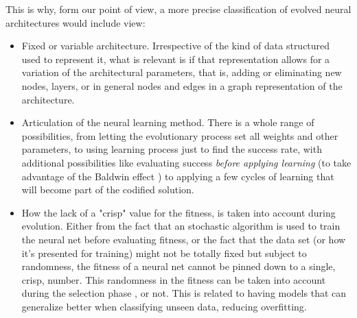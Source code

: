 \documentclass[conference]{IEEEtran}\usepackage[]{graphicx}\usepackage[]{color}
\begin{document}
This is why, form our point of view, a more precise classification of evolved neural architectures would include
view: \begin{itemize}
  \item Fixed or variable architecture. Irrespective of the kind of
    data structured used to represent it, what is relevant is if that
    representation allows for a variation of the architectural
    parameters, that is, adding or eliminating new nodes, layers, or
    in general nodes and edges in a graph representation of the
    architecture.
  \item Articulation of the neural learning method. There is a whole
    range of possibilities, from letting the evolutionary process set
    all weights and other parameters, to using learning process just
    to find the success rate, with additional possibilities like
    evaluating success {\em before applying learning} (to take
    advantage of the Baldwin effect \cite{castillo-2006}) to applying
    a few cycles of learning that will become part of the codified
    solution.
  \item How the lack of a "crisp" value for the fitness, is taken into account
    during evolution. Either from the fact that an stochastic algorithm is
    used to train the neural net before evaluating fitness, or the
    fact that the data set (or how it's presented for training) might not be totally fixed but subject to
    randomness, the fitness of a neural net cannot be pinned down to a
    single, crisp, number. This randomness in the fitness can be taken
    into account during the selection phase
    \cite{DBLP:conf/ijcci/MereloLFGCCRMG15}, or not. This is related to 
    having models that can generalize better when classifying unseen data,
    reducing overfitting. 

\end{itemize}
\end{document}
